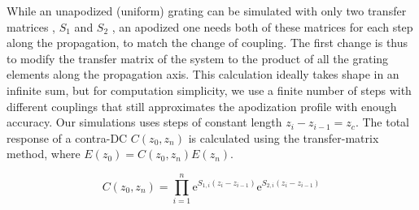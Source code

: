 \documentclass[osajnl,twocolumn,showpacs,superscriptaddress,10pt]{revtex4-1}
\newcommand{\me}{\mathrm{e}}
\newcommand*\diff{\mathop{}\!\mathrm{d}}
\begin{document}

While an unapodized (uniform) grating can be simulated with only two transfer matrices , $S_1$ and $S_2$ \cite{shi2013siliconContraDC}, an apodized one needs both of these matrices for each step along the propagation, to match the change of coupling. 
The first change is thus to modify the transfer matrix of the system to the product of all the grating elements along the propagation axis.
This calculation ideally takes shape in an infinite sum, but for computation simplicity, we use a finite number of steps with different couplings that still approximates the apodization profile with enough accuracy. 
Our simulations uses  steps of constant length $z_i-z_{i-1}=z_c$. 
The total response of a contra-DC $C(z_0,z_n)$ is calculated using the transfer-matrix method, where $E(z_0)=C(z_0,z_n) E(z_n)$.

\begin{equation}
\label{eq:CMatrix}
 C(z_0,z_n) =  \prod_{i=1}^{n}\me^{S_{1,i}(z_i-z_{i-1})}\me^{S_{2,i}(z_i-z_{i-1})}
\end{equation}


\end{document}

